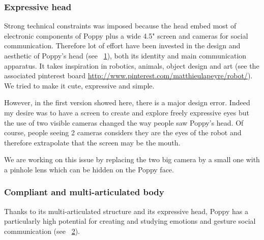 \subsubsection{Expressive head} %
Strong technical constraints was imposed because the head embed most of electronic components of Poppy plus a wide 4.5" screen and cameras for social communication. Therefore lot of effort have been invested in the design and aesthetic of Poppy's head (see \figurename~\ref{fig:poppy_beta_head}), both its identity and main communication apparatus. It takes inspiration in robotics, animals, object design and art (see the associated pinterest board \url{http://www.pinterest.com/matthieulapeyre/robot/}). We tried to make it cute, expressive and simple.

\begin{figure}[]
\centering
    \hfil
    \caption{}
    \label{fig:poppy_beta_head}
\end{figure}

However, in the first version showed here, there is a major design error. Indeed my desire was to have a screen to create and explore freely expressive eyes but the use of two visible cameras changed the way people saw Poppy's head. Of course, people seeing 2 cameras considers they are the eyes of the robot and therefore extrapolate that the screen may be the mouth.

We are working on this issue by replacing the two big camera by a small one with a pinhole lens which can be hidden on the Poppy face.


\subsubsection{Compliant and multi-articulated body} %

Thanks to its multi-articulated structure and its expressive head, Poppy has a particularly high potential for creating and studying emotions and gesture social communication (see \figurename~\ref{fig:TER_cognitic}).

\begin{figure}[]
\centering
    \hfil
    \\
    \hfil
    \caption{}
    \label{fig:TER_cognitic}
\end{figure}



